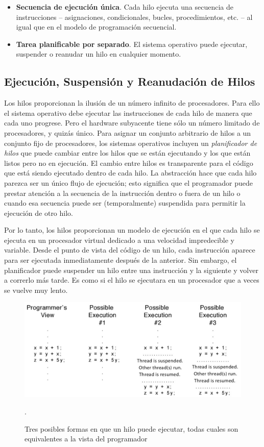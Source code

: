 \documentclass[10pt]{book}
\begin{document}
\begin{itemize}
\item  \textbf{Secuencia de ejecución única}. Cada hilo ejecuta una secuencia de instrucciones -- asignaciones, condicionales, bucles, procedimientos, etc. -- al igual que en el modelo de programación secuencial.
\item \textbf{Tarea planificable por separado}. El sistema operativo puede ejecutar, suspender o reanudar un hilo en cualquier momento.
\end{itemize}

\subsection{Ejecución, Suspensión y Reanudación de Hilos}
Los hilos proporcionan la ilusión de un número infinito de procesadores. Para ello el sistema operativo debe ejecutar las instrucciones de cada hilo de manera que cada uno progrese. Pero el hardware subyacente tiene sólo un número limitado de procesadores, y quizás único. Para asignar un conjunto arbitrario de hilos a un conjunto fijo de procesadores, los sistemas operativos incluyen un \textit{planificador de hilos} que puede cambiar entre los hilos que se están ejecutando y los que están listos pero no en ejecución. El cambio entre hilos es transparente para el código que está siendo ejecutado dentro de cada hilo. La abstracción hace que cada hilo parezca ser un único flujo de ejecución; esto significa que el programador puede prestar atención a la secuencia de la instrucción dentro o fuera de un hilo o cuando esa secuencia puede ser (temporalmente) suspendida para permitir la ejecución de otro hilo.

Por lo tanto, los hilos proporcionan un modelo de ejecución en el que cada hilo se ejecuta en un procesador virtual dedicado a una velocidad impredecible y variable. Desde el punto de vista del código de un hilo, cada instrucción aparece para ser ejecutada inmediatamente después de la anterior. Sin embargo, el planificador puede suspender un hilo entre una instrucción y la siguiente y volver a correrlo más tarde. Es como si el hilo se ejecutara en un procesador que a veces se vuelve muy lento.

\begin{figure}[tbhp]
\centerline{\includegraphics[scale=0.50]{img/fig0401}}
\caption{Tres posibles formas en que un hilo puede ejecutar, todas cuales son equivalentes a la vista del programador}.
\label{fig0401}
\end{figure}
\end{document}
